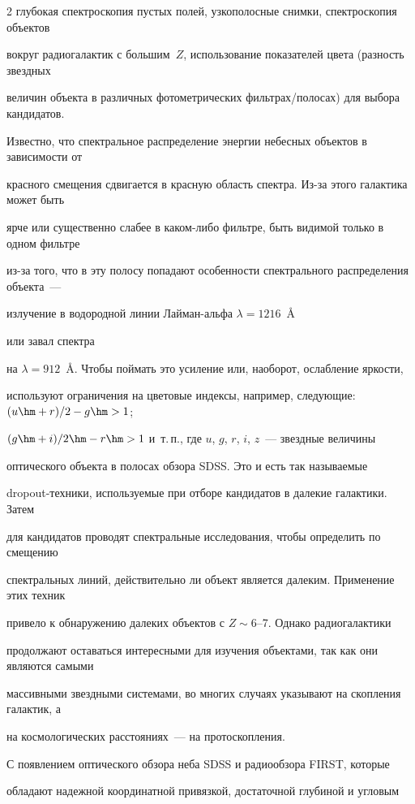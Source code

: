 \begin{multicols}{2}
глубокая спектроскопия пустых полей, узкополосные снимки, спектроскопия объектов 

вокруг радиогалактик с большим~$Z$, использование показателей цвета (разность звездных 

величин объекта в различных фотометрических фильтрах/полосах) для выбора кандидатов. 

Известно, что спектральное распределение энергии небесных объектов в зависимости от 

красного смещения сдвигается в красную область спектра. Из-за этого галактика может быть 

ярче или существенно слабее в каком-либо фильтре, быть видимой только в одном фильтре 

из-за того, что в эту полосу попадают особенности спектрального распределения объекта~--- 

излучение в водородной линии Лай\-ман-аль\-фа $\lambda=1216$~{\ptb\AA} 

или завал спектра 

на $\lambda=912$~{\ptb\AA}. Чтобы поймать это усиление или, наоборот, ослабление яркости, 

используют ограничения на цветовые индексы, например, следующие: $(u\hm+r)/2-g\hm>1$; 

$(g\hm+i)/2\hm-r \hm>1$ и~т.\,п., где $u$, $g$, $r$, $i$, $z$~--- звездные величины 

оптического объекта в полосах обзора SDSS. Это и есть так называемые 

dropout-тех\-ни\-ки, используемые при отборе кандидатов в далекие галактики. Затем 

для кандидатов проводят спектральные исследования, чтобы определить по смещению 

спектральных линий, действительно ли объект является далеким. Применение этих техник 

привело к обнаружению далеких объектов с $Z\sim6$--7. Однако радиогалактики 

продолжают оставаться интересными для изучения объектами, так как они являются самыми 

массивными звездными системами, во многих случаях указывают на скопления галактик, а 

на космологических расстояниях~--- на протоскопления. 

      

      С появлением оптического обзора неба SDSS и радиообзора FIRST, которые 

обладают надежной координатной привязкой, достаточной глубиной и угловым 


\end{multicols}
